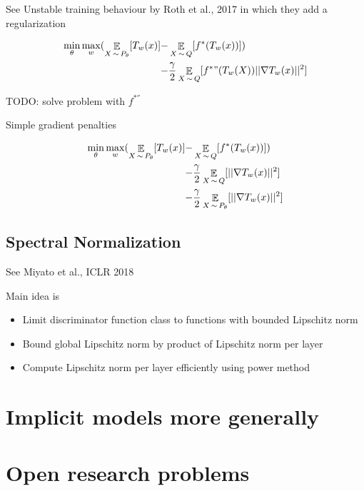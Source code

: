 See Unstable training behaviour by Roth et al., 2017 in which they add a
regularization

\begin{align}
  \min_\theta \max_w ( \operatorname*{\mathbb{\mathop{E}}}_{X\operatorname*{\sim} P_\theta}[T_w(x)]
    -& \operatorname*{\mathbb{\mathop{E}}}_{X\operatorname*{\sim} Q}[f^*(T_w(x))]) \\
  -& \frac{\gamma}{2} \operatorname*{\mathbb{\mathop{E}}}_{X\operatorname*{\sim} Q}[ f^*"(T_w(X)) || \nabla T_w(x)||^2]
\end{align}

TODO: solve problem with $f^{*''}$

Simple gradient penalties

\begin{align}
  \min_\theta \max_w ( \operatorname*{\mathbb{\mathop{E}}}_{X\operatorname*{\sim} P_\theta}[T_w(x)]
    -& \operatorname*{\mathbb{\mathop{E}}}_{X\operatorname*{\sim} Q}[f^*(T_w(x))])  \\
    -& \frac{\gamma}{2} \operatorname*{\mathbb{\mathop{E}}}_{X\operatorname*{\sim} Q}[|| \nabla T_w(x)||^2] \\
    -& \frac{\gamma}{2} \operatorname*{\mathbb{\mathop{E}}}_{X\operatorname*{\sim} P_\theta}[|| \nabla T_w(x)||^2]
\end{align}

\subsection{Spectral Normalization}

See Miyato et al., ICLR 2018 \cite{miyato2018spectral}

Main idea is

\begin{itemize}
  \item Limit discriminator function class to functions with bounded Lipschitz
    norm
  \item Bound global Lipschitz norm by product of Lipschitz norm per layer
  \item Compute Lipschitz norm per layer efficiently using power method
\end{itemize}

\section{Implicit models more generally}
\section{Open research problems}


